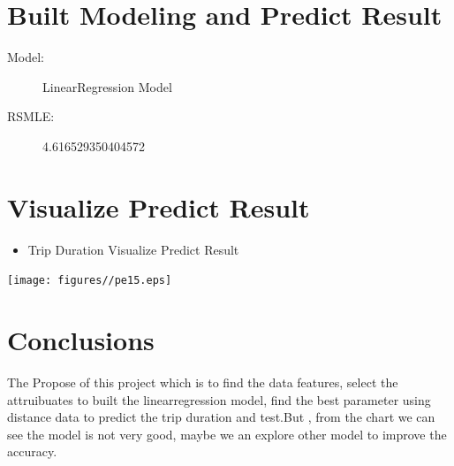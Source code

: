 \section{Built Modeling and Predict Result}
{
	\begin{description}
		\item[Model:] LinearRegression Model
		
	\end{description}
	\vspace{.5cm}
	\begin{description}
		\item[RSMLE:] 4.616529350404572
		
	\end{description}
	
}




\section{Visualize Predict Result}


{
	\begin{itemize}
		\item
		Trip Duration Visualize Predict Result
	\end{itemize} 
	\vspace{0.5cm} 
	\begin{flushleft}
		\centering
		\texttt{[image: figures//pe15.eps]}\\
	\end{flushleft}
	
}

\section{Conclusions} \label{sec-conclusions}

The Propose of this project which is to find the data features, select the attruibuates to built the linearregression model, find the best parameter using distance data to predict the trip duration and test.But , from the chart we can see the model is not very good, maybe we an explore other model to improve the accuracy.



